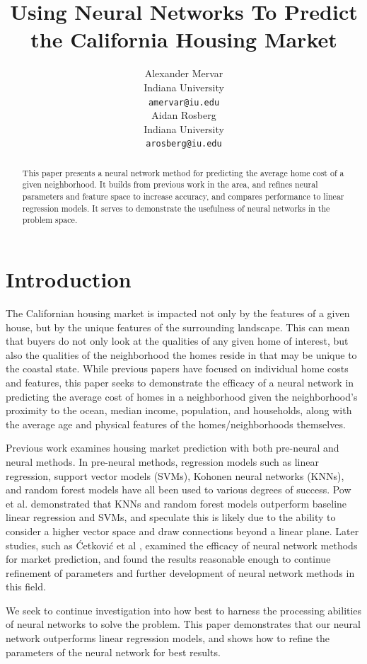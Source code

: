 \documentclass[11pt]{article}
\title{Using Neural Networks To Predict the California Housing Market}
\author{Alexander Mervar \\
 Indiana University \\
 \texttt{amervar@iu.edu} \\\And
 Aidan Rosberg \\
 Indiana University \\
 \texttt{arosberg@iu.edu}\\}
\begin{document}
\maketitle
\begin{abstract}
This paper presents a neural network method for predicting the average home cost of a given neighborhood. It builds from previous work in the area, and refines neural parameters and feature space to increase accuracy, and compares performance to linear regression models. It serves to demonstrate the usefulness of neural networks in the problem space.
\end{abstract}

\section{Introduction}
The Californian housing market is impacted not only by the features of a given house, but by the unique features of the surrounding landscape. This can mean that buyers do not only look at the qualities of any given home of interest, but also the qualities of the neighborhood the homes reside in that may be unique to the coastal state. While previous papers have focused on individual home costs and features, this paper seeks to demonstrate the efficacy of a neural network in predicting the average cost of homes in a neighborhood given the neighborhood’s proximity to the ocean, median income, population, and households, along with the average age and physical features of the homes/neighborhoods themselves.

Previous work examines housing market prediction with both pre-neural and neural methods. In pre-neural methods, regression models such as linear regression, support vector models (SVMs), Kohonen neural networks (KNNs), and random forest models have all been used to various degrees of success. Pow et al. \cite{Pow2014} demonstrated that KNNs and random forest models outperform baseline linear regression and SVMs, and speculate this is likely due to the ability to consider a higher vector space and draw connections beyond a linear plane. Later studies, such as Ćetković et al \cite{Cetkovic2018}, examined the efficacy of neural network methods for market prediction, and found the results reasonable enough to continue refinement of parameters and further development of neural network methods in this field.

We seek to continue investigation into how best to harness the processing abilities of neural networks to solve the problem. This paper demonstrates that our neural network outperforms linear regression models, and shows how to refine the parameters of the neural network for best results.
\end{document}
